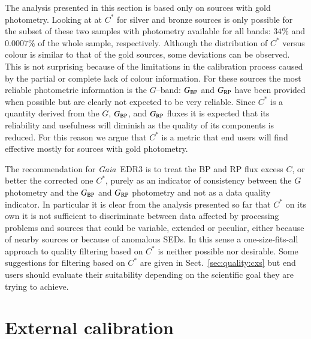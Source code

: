 \documentclass{aa}
\newcommand{\gaia}{\textit{Gaia}\xspace}
\newcommand{\gband}{$G$--band\xspace}
\newcommand{\gbp}{\ensuremath{G_{\rm BP}}\xspace}
\newcommand{\grp}{\ensuremath{G_{\rm RP}}\xspace}
\newcommand{\cxs}{\ensuremath{C^{\ast}}\xspace}
\newcommand{\edr}{\gaia~EDR3\xspace}
\newcommand{\xp}{BP and RP\xspace}
\newcommand{\secname}{Sect.}
\newcommand{\secref}[1]{\secname~\ref{sec:#1}}
\begin{document}
The analysis presented in this section is based only on sources with gold photometry. Looking at at \cxs for silver and bronze sources is only possible for the subset of these two samples with photometry available for all bands: $34\%$ and $0.0007\%$ of the whole sample, respectively. Although the distribution of \cxs versus colour is similar to that of the gold sources, some deviations can be observed. This is not surprising because of the limitations in the calibration process caused by the partial or complete lack of colour information. For these sources the most reliable photometric information is the \gband: \gbp and \grp have been provided when possible but are clearly not expected to be very reliable. Since \cxs is a quantity derived from the $G$, \gbp, and \grp fluxes it is expected that its reliability and usefulness will diminish as the quality of its components is reduced. For this reason we argue that \cxs is a metric that end users will find effective mostly for sources with gold photometry.

The recommendation for \edr is to treat the \xp flux excess $C$, or better the corrected one \cxs, purely as an indicator of consistency between the $G$ photometry and the \gbp and \grp photometry and not as a data quality indicator. In particular it is clear from the analysis presented so far that \cxs on its own it is not sufficient to discriminate between data affected by processing problems and sources that could be variable, extended or peculiar, either because of nearby sources or because of anomalous SEDs. In this sense a one-size-fits-all approach to quality filtering based on \cxs is neither possible nor desirable. Some suggestions for filtering based on \cxs are given in \secref{quality:cxs} but end users should evaluate their suitability depending on the scientific goal they are trying to achieve. 


\section{External calibration}\label{sec:extcal}
\end{document}
